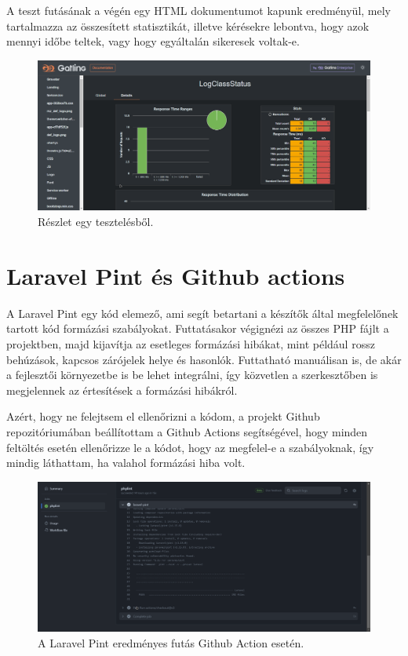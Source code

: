 \documentclass[
]{thesis-ekf}
\theoremstyle{definition}
\theoremstyle{remark}
\begin{document}


A teszt futásának a végén egy HTML dokumentumot kapunk eredményül, mely tartalmazza az összesített statisztikát, illetve kérésekre lebontva, hogy azok mennyi időbe teltek, vagy hogy egyáltalán sikeresek voltak-e.

\begin{figure}[ht!]
	\centering
	\includegraphics[width=16cm]{../pictures/screenshots/gatling.png}
	\caption{Részlet egy tesztelésből.}
	\label{gatlingResult}
\end{figure}

\section{Laravel Pint és Github actions}

A Laravel Pint egy kód elemező, ami segít betartani a készítők által megfelelőnek tartott kód formázási szabályokat. Futtatásakor végignézi az összes PHP fájlt a projektben, majd kijavítja az esetleges formázási hibákat, mint például rossz behúzások, kapcsos zárójelek helye és hasonlók.\cite{pint} Futtatható manuálisan is, de akár a fejlesztői környezetbe is be lehet integrálni, így közvetlen a szerkesztőben is megjelennek az értesítések a formázási hibákról. 

Azért, hogy ne felejtsem el ellenőrizni a kódom, a projekt Github repozitóriumában beállítottam a Github Actions\cite{actions} segítségével, hogy minden feltöltés esetén ellenőrizze le a kódot, hogy az megfelel-e a szabályoknak, így mindig láthattam, ha valahol formázási hiba volt.

\begin{figure}[ht!]
	\centering
	\includegraphics[width=15cm]{../pictures/screenshots/githubActions.png}
	\caption{A Laravel Pint eredményes futás Github Action esetén.}
	\label{githubActions}
\end{figure}
\end{document}

